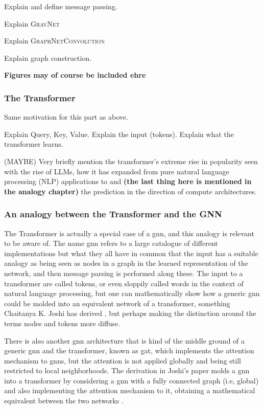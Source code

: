 Explain and define message passing.

Explain \textsc{GravNet}

Explain \textsc{GraphNetConvolution} \cite{qasim2019-gravnet}


Explain graph construction.

\textbf{Figures may of course be included ehre}

\subsubsection{The Transformer}

Same motivation for this part as above. 

Explain Query, Key, Value. Explain the input (tokens). Explain what the transformer learns. 

(MAYBE) Very briefly mention the transformer's extreme rise in popularity seen with the rise of LLMs, how it has expanded from pure natural language processing (NLP) applications to and \textbf{(the last thing here is mentioned in the analogy chapter)} the prediction in the direction of compute architectures.


\subsubsection{An analogy between the Transformer and the GNN}

The Transformer is actually a special case of a \gls{gnn}, and this analogy is relevant to be aware of. The name \gls{gnn} refers to a large catalogue of different implementations but what they all have in common that the input has a suitable analogy as being seen as nodes in a graph in the learned representation of the network, and then message parsing is performed along these. The input to a transformer are called tokens, or even sloppily called words in the context of natural language processing, but one can mathematically show how a generic \gls{gnn} could be molded into an equivalent network of a transformer, something Chaitanya K. Joshi has derived \cite{joshi2025transformersgnn}, but perhaps making the distinction around the terms nodes and tokens more diffuse. 

There is also another \gls{gnn} architecture that is kind of the middle ground of a generic \gls{gnn} and the transformer, known as \gls{gat}, which implements the attention mechanism to \gls{gnn}s, but the attention is not applied globally and being still restricted to local neighborhoods. The derivation in Joshi's paper molds a \gls{gnn} into a transformer by considering a \gls{gnn} with a fully connected graph (i.e, global) and also implementing the attention mechanism to it, obtaining a mathematical equivalent between the two networks \cite{joshi2025transformersgnn}. 

